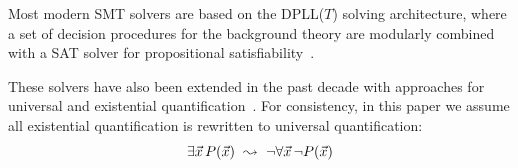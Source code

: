 \documentclass{easychair}
\begin{document}
Most modern SMT solvers are based on the DPLL($T$) solving architecture,
where a set of decision procedures for the background theory are modularly combined with a SAT solver for propositional satisfiability~\cite{nieuwenhuis2006solving}.

These solvers have also been extended 
in the past decade with approaches for universal and existential quantification~\cite{Detlefs03simplify:a,MouraBjoerner07,GeBarrettTinelli07}.
For consistency, in this paper we assume all existential quantification is rewritten to universal quantification:
\[
\exists \vec x\, P( \vec x ) \ \leadsto \  \neg \forall \vec x\, \neg P( \vec x )
\]
\end{document}
